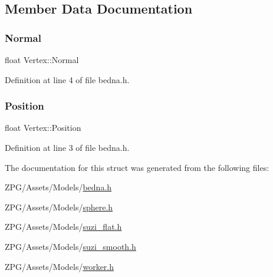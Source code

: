 \subsection{Member Data Documentation}
\mbox{\label{structVertex_a21d39482cfec221ea8ed9e9fab50b13e}} 
\subsubsection{\texorpdfstring{Normal}{Normal}}
{\footnotesize\ttfamily float Vertex\+::\+Normal}



Definition at line 4 of file bedna.\+h.

\mbox{\label{structVertex_a85b45e0a1f35880b510cd5c3cd5a5296}} 
\subsubsection{\texorpdfstring{Position}{Position}}
{\footnotesize\ttfamily float Vertex\+::\+Position}



Definition at line 3 of file bedna.\+h.



The documentation for this struct was generated from the following files\+:\begin{DoxyCompactItemize}
\item 
Z\+P\+G/\+Assets/\+Models/\mbox{\hyperlink{bedna_8h}{bedna.\+h}}\item 
Z\+P\+G/\+Assets/\+Models/\mbox{\hyperlink{sphere_8h}{sphere.\+h}}\item 
Z\+P\+G/\+Assets/\+Models/\mbox{\hyperlink{suzi__flat_8h}{suzi\+\_\+flat.\+h}}\item 
Z\+P\+G/\+Assets/\+Models/\mbox{\hyperlink{suzi__smooth_8h}{suzi\+\_\+smooth.\+h}}\item 
Z\+P\+G/\+Assets/\+Models/\mbox{\hyperlink{worker_8h}{worker.\+h}}\end{DoxyCompactItemize}
